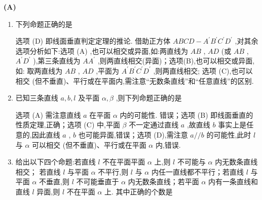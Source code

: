 \begin{center}  \textbf{(A)} \end{center}
\begin{enumerate}
    \item 下列命题正确的是
    \begin{jieda}
        选项 (D) 即线面垂直判定定理的推论. 借助正方体 ${ABCD} - {A}^{\prime }{B}^{\prime }{C}^{\prime }{D}^{\prime }$ ,对其余选项分析如下:选项 (A) ,也可以相交或异面,如:两直线为 ${AB}$ , ${AD}$ (或 ${AB}$ , ${A}^{\prime }{D}^{\prime }$ ),第三条直线为 $A{A}^{\prime }$ ,则两直线相交(异面)；选项(B),也可以相交或异面,如: 取两直线为 ${AB}$ , ${AD}$ ,平面为 ${A}^{\prime }{B}^{\prime }{C}^{\prime }{D}^{\prime }$ ,则两直线相交; 选项 (C),也可以相交 (但不垂直)、平行或在平面内,需注意“无数条直线”和“任意直线”的区别.
    \end{jieda}
    \item 已知三条直线 $a,b,l$ 及平面 $\alpha ,\beta$ ,则下列命题正确的是 
    \begin{jieda}
        选项 (A) 需注意直线 $a$ 在平面 $\alpha$ 内的可能性. 错误；选项 (B) 即线面垂直的性质定理,正确；选项 (C) 中,平面 $\beta$ 不一定通过直线 $a$ ,故直线 $b$ 事实上是任意的,因此直线 $a$ , $b$ 也可能异面,错误；选项 (D),需注意 $a//b$ 的可能性,此时 $l$ 与 $\alpha$ 可以相交 (但不垂直)、平行或在平面 $\alpha$ 内,错误.
    \end{jieda}
    \item 给出以下四个命题:若直线 $l$ 不在平面平面 $\alpha$ 上,则 $l$ 不可能与 $\alpha$ 内无数条直线相交； 若直线 $l$ 与平面 $\alpha$ 不平行,则 $l$ 与 $\alpha$ 内任一直线都不平行；若直线 $l$ 与平面 $\alpha$ 不垂直,则 $l$ 不可能垂直于 $\alpha$ 内无数条直线；若平面 $\alpha$ 内有一条直线和直线 $l$ 异面,则 $l$ 不在平面 $\alpha$ 上. 其中正确的个数是
    \begin{jieda}

\end{jieda}
\end{enumerate}
